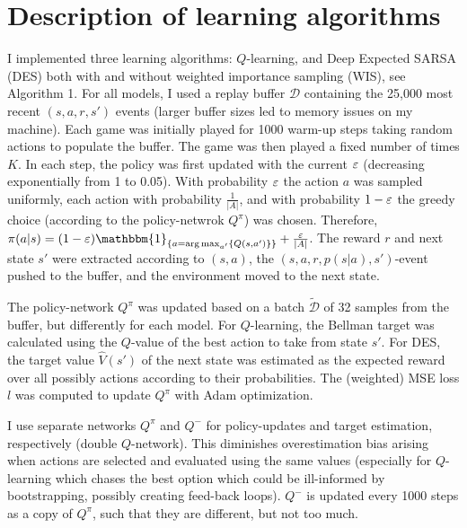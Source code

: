 \documentclass{article}
\begin{document}
\section{Description of learning algorithms}
I implemented three learning algorithms: \(Q\)-learning, and Deep Expected SARSA (DES) both with and without weighted importance sampling (WIS), see Algorithm 1.
For all models, I used a replay buffer \(\mathcal{D}\) containing the 25,000 most recent \((s, a, r, s')\) events (larger buffer sizes led to memory issues on my machine). Each game was initially played for 1000 warm-up steps taking random actions to populate the buffer. The game was then played a fixed number of times \(K\). In each step, the policy was first updated with the current \(\varepsilon\) (decreasing exponentially from 1 to 0.05). With probability \(\varepsilon\) the action \(a\) was sampled uniformly, each action with probability \(\frac{1}{|A|}\), and with probability \(1-\varepsilon\) the greedy choice (according to the policy-netwrok \(Q^\pi\)) was chosen. Therefore, \(\pi(a|s) = (1 - \eps) \mathbbm{1}_{\set{a = \arg\max_{a'}\set{Q(s,a')}}} + \frac{\eps}{|A|}\). The reward \(r\) and next state \(s'\) were extracted according to \((s,a)\), the \((s, a, r, p(s|a), s')\)-event pushed to the buffer, and the environment moved to the next state.

The policy-network \(Q^\pi\) was updated based on a batch \(\tilde{\mathcal{D}}\) of 32 samples from the buffer, but differently for each model. For \(Q\)-learning, the Bellman target was calculated using the \(Q\)-value of the best action to take from state \(s'\). For DES, the target value \(\hat{V}(s')\) of the next state was estimated as the expected reward over all possibly actions according to their probabilities. The (weighted) MSE loss \(l\) was computed to update \(Q^\pi\) with Adam optimization.

I use separate networks \(Q^\pi\) and \(Q^-\) for policy-updates and target estimation, respectively (double \(Q\)-network). This diminishes overestimation bias arising when actions are selected and evaluated using the same values (especially for \(Q\)-learning which chases the best option which could be ill-informed by bootstrapping, possibly creating feed-back loops). \(Q^-\) is updated every 1000 steps as a copy of \(Q^\pi\), such that they are different, but not too much.
\end{document}
